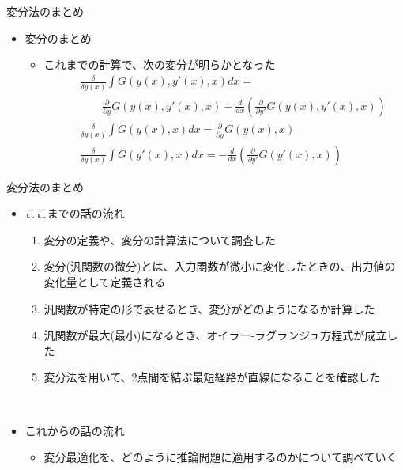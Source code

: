 \documentclass[dvipdfmx,notheorems,t]{beamer}
\begin{document}
\begin{frame}{変分法のまとめ}

\begin{itemize}
	\item 変分のまとめ
	\begin{itemize}
		\item これまでの計算で、次の変分が明らかとなった
		\begin{eqnarray}
			&& \frac{\delta}{\delta y(x)} \int G(y(x), y'(x), x) dx = \nonumber \\
			&& \qquad \frac{\partial}{\partial y} G(y(x), y'(x), x) - \frac{d}{dx} \left( \frac{\partial}{\partial y'} G(y(x), y'(x), x) \right) \\
			&& \frac{\delta}{\delta y(x)} \int G(y(x), x) dx = \frac{\partial}{\partial y} G(y(x), x) \\
			&& \frac{\delta}{\delta y(x)} \int G(y'(x), x) dx = - \frac{d}{dx} \left( \frac{\partial}{\partial y'} G(y'(x), x) \right)
		\end{eqnarray}
	\end{itemize}
\end{itemize}

\end{frame}

\begin{frame}{変分法のまとめ}

\begin{itemize}
	\item ここまでの話の流れ
	\begin{enumerate}
		\item 変分の定義や、変分の計算法について調査した
		\newline
		\item \alert{変分}(汎関数の微分)とは、入力関数が微小に変化したときの、出力値の変化量として定義される
		\newline
		\item 汎関数が特定の形で表せるとき、変分がどのようになるか計算した
		\item 汎関数が最大(最小)になるとき、\alert{オイラー-ラグランジュ方程式}が成立した
		\newline
		\item 変分法を用いて、2点間を結ぶ最短経路が\alert{直線}になることを確認した
	\end{enumerate} \
	
	\item これからの話の流れ
	\begin{itemize}
		\item 変分最適化を、どのように推論問題に適用するのかについて調べていく
	\end{itemize}
\end{itemize}

\end{frame}
\end{document}
